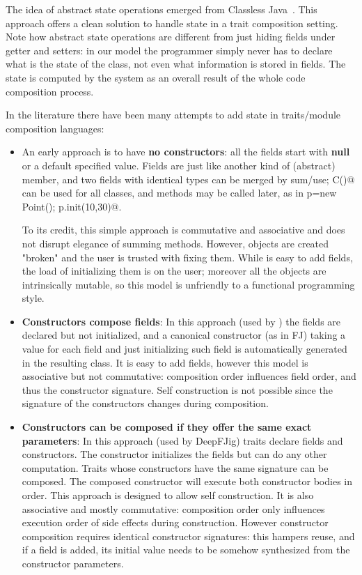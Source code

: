 The idea of abstract state operations emerged from Classless
Java~\cite{wang2016classless}. This approach offers a clean solution to handle state
in a trait composition setting.
Note how abstract state operations are different from just hiding fields under getter and setters: 
in our model the programmer simply never has to declare what is the state of the class, not even what information is stored in fields.
The state is computed by the system as an overall result of the whole code composition process.

In the literature there have been many attempts to add state in traits/module composition languages:
\begin{itemize}  
\item An early approach is to have {\bf no constructors}: all the fields start with {\bf null} or a default specified value.
  Fields are just like another kind of (abstract) member, and two fields
  with identical types can be merged by sum/use; \Q@new C()@ can be used for all classes, and \Q@init@ methods may be called later, as in
  \Q@Point p=new Point(); p.init(10,30)@.
  
  To its credit, this simple approach is commutative and associative and does not disrupt elegance of summing methods.
  However, objects are created "broken" and the user is trusted with fixing them.
  While is easy to add fields, the load of initializing them is on the user; moreover
    all the objects are intrinsically mutable, so this model is unfriendly
    to a functional programming style.
\item {\bf Constructors compose fields}:
In this approach (used by \cite{fjig}) the fields are declared but not initialized, and
a canonical constructor (as in FJ) taking a value for each field and just initializing such field
is automatically generated in the resulting class.
It is easy to add fields, however this model is associative but not commutative: composition order influences field order, and thus the constructor signature.
Self construction is not possible 
since the signature of the constructors changes during composition.

\item {\bf Constructors can be composed if they offer the same exact parameters}:
In this approach (used by DeepFJig) traits declare fields and constructors.
The constructor initializes the fields but can do any other computation.
Traits whose constructors have the same signature can be composed.
The composed constructor will execute both constructor bodies in order.
This approach is designed to allow self construction.
It is also associative and mostly commutative: composition order only influences execution order of side effects during construction.
However constructor composition requires identical constructor signatures: this
hampers reuse, and if a field is added, its initial value needs to be
somehow synthesized from the constructor parameters.

\end{itemize}

